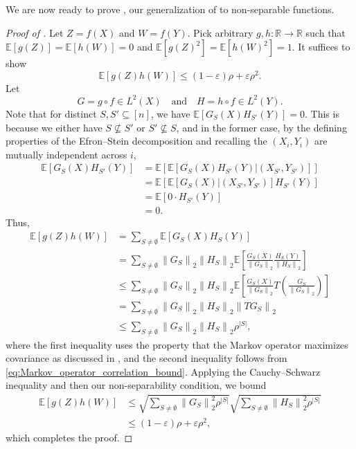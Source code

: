 \documentclass[12pt,letterpaper]{amsart}
\def\E{\mathbb{E}}
\def\R{\mathbb{R}}
\newcommand{\norm}[1]{\left\lVert#1\right\rVert}
\newcommand{\abs}[1]{\left\lvert#1\right\rvert}
\newcommand{\paren}[1]{\left(#1\right)}
\newcommand{\bracket}[1]{\left[#1\right]}
\newcommand{\1}[1]{1_{\left\{#1\right\}}}
\theoremstyle{definition}
\theoremstyle{remark}
\begin{document}
We are now ready to prove , our generalization of  to non-separable functions.
\begin{proof}[Proof of ]
    Let $Z=f(X)$ and $W=f(Y)$.
    Pick arbitrary $g,h:\R\to\R$ such that $\E[g(Z)]=\E[h(W)]=0$ and $\E[g(Z)^2]=\E[h(W)^2]=1$.
    It suffices to show
    \[ \E[g(Z)h(W)]\leq(1-\varepsilon)\rho+\varepsilon\rho^2. \]
    Let
    \[ G=g\circ f\in L^2(X) \quad\text{and}\quad H=h\circ f\in L^2(Y). \]
    Note that for distinct $S,S'\subseteq[n]$, we have $\E[G_S(X) H_{S'}(Y)]=0$.
    This is because we either have $S\not\subseteq S'$ or $S'\not\subseteq S$, and in the former case, by the defining properties of the Efron--Stein decomposition and recalling the $(X_i,Y_i)$ are mutually independent across $i$,
    \begin{align*}
        \E[G_S(X)H_{S'}(Y)]
        &= \E[\E[G_S(X)H_{S'}(Y)|(X_{S'},Y_{S'})]]
        \\ &= \E[\E[G_S(X)|(X_{S'},Y_{S'})]H_{S'}(Y)]
        \\ &= \E[0\cdot H_{S'}(Y)]
        \\ &= 0.
    \end{align*}
    Thus,
    \begin{align*}
        \E[g(Z)h(W)]
        &= \sum_{S\neq\emptyset}\E[G_S(X)H_S(Y)]
        \\ &= \sum_{S\neq\emptyset}\norm{G_S}_2\norm{H_S}_2\E\bracket{\frac{G_S(X)}{\norm{G_S}_2}\frac{H_S(Y)}{\norm{H_S}_2}}
        \\ &\leq \sum_{S\neq\emptyset}\norm{G_S}_2\norm{H_S}_2\E\bracket{\frac{G_S(X)}{\norm{G_S}_2}T\paren{\frac{G_S}{\norm{G_S}_2}}}
        \\ &= \sum_{S\neq\emptyset}\norm{G_S}_2\norm{H_S}_2\norm{TG_S}_2
        \\ &\leq \sum_{S\neq\emptyset}\norm{G_S}_2\norm{H_S}_2\rho^{\abs{S}},
    \end{align*}
    where the first inequality uses the property that the Markov operator maximizes covariance as discussed in , and the second inequality follows from \eqref{eq:Markov_operator_correlation_bound}.
    Applying the Cauchy--Schwarz inequality and then our non-separability condition, we bound
    \begin{align*}
        \E[g(Z)h(W)]
        &\leq \sqrt{\sum_{S\neq\emptyset}\norm{G_S}_2^2\rho^{\abs{S}}}\sqrt{\sum_{S\neq\emptyset}\norm{H_S}_2^2\rho^{\abs{S}}}
        \\&\leq (1-\varepsilon)\rho+\varepsilon\rho^2,
    \end{align*}
    which completes the proof.
\end{proof}
\end{document}
